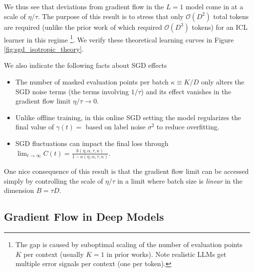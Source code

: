 \documentclass{article} %
\begin{document}
We thus see that deviations from gradient flow in the $L=1$ model come in at a scale of $\eta / \tau$. The purpose of this result is to stress that only $\mathcal O(D^2)$ total tokens are required (unlike the prior work of \cite{lu2025asymptotictheoryincontextlearning} which required $\mathcal{O}(D^3)$ tokens) for an ICL learner in this regime \footnote{The gap is caused by suboptimal scaling of the number of evaluation points $K$ per context (usually $K=1$ in prior works). Note realistic LLMs get multiple error signals per context (one per token).}. We verify these theoretical learning curves in Figure \ref{fig:sgd_isotropic_theory}. 

We also indicate the following facts about SGD effects
\begin{itemize}
    \item The number of masked evaluation points per batch $\kappa \equiv K/D$ only alters the SGD noise terms (the terms involving $1/\tau$) and its effect vanishes in the gradient flow limit $\eta / \tau \to 0$.
    \item Unlike offline training, in this online SGD setting the model regularizes the final value of $\gamma(t) = $ based on label noise $\sigma^2$ to reduce overfitting.  
    \item SGD fluctuations can impact the final loss through $\lim_{t\to\infty} C(t) = \frac{b(\eta,\alpha,\tau,\kappa)}{1-a(\eta,\alpha,\tau,\kappa)}$. 
\end{itemize}
One nice consequence of this result is that the gradient flow limit can be accessed simply by controlling the scale of $\eta/\tau$ in a limit where batch size is \textit{linear} in the dimension $B = \tau D$. 

\subsection{Gradient Flow in Deep Models}\label{app:grad_flow_iso_deep}
\end{document}
